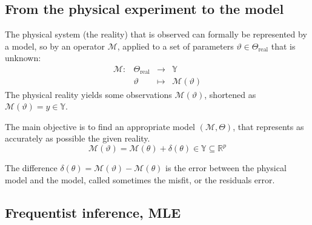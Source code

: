 \documentclass[a4paper,11pt]{article}
\newcommand{\Yspace}{\mathbb{Y}}
\theoremstyle{defi}
\numberwithin{thmCounter}{section}
\begin{document}
\subsection{From the physical experiment to the model}
\label{ssec:inv_problem}
The physical system (the reality) that is observed can formally be represented by a model, so by an operator $\mathscr{M}$, applied to a set of parameters $\vartheta \in \Theta_{\mathrm{real}}$ that is unknown:
\begin{equation*}
  \begin{array}{llll}
    \mathscr{M} :& \Theta_{\mathrm{real}} &\longrightarrow& \Yspace \\
                 & \vartheta & \longmapsto& \mathscr{M}(\vartheta)
  \end{array}
\end{equation*}
The physical reality yields some observations $\mathscr{M}(\vartheta)$, shortened as $\mathscr{M}(\vartheta) = y\in\Yspace$.

The main objective is to find an appropriate model $(\mathcal{M},\Theta)$, that represents as accurately as possible the given reality.
\begin{equation*}
    \mathscr{M}(\vartheta) = %
    \mathcal{M}(\theta) + \delta(\theta) \in \Yspace \subseteq \mathbb{R}^p
  \end{equation*}
  
The difference $\delta(\theta) = \mathscr{M}(\vartheta) - \mathcal{M}(\theta)$ is the error between the physical model and the model, called sometimes the misfit, or the residuals error.

\subsection{Frequentist inference, MLE}
\label{sec:frequentist_inference_MLE}
\end{document}
